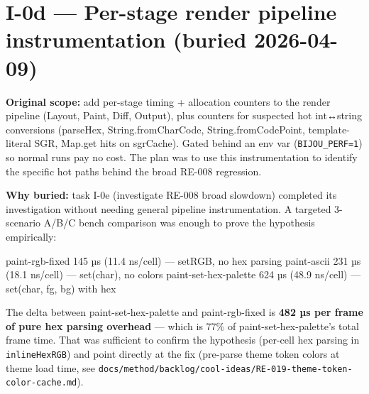 \chapter{I-0d --- Per-stage render pipeline instrumentation (buried 2026-04-09)}\label{record-420}

\smallskip

\textbf{Original scope:} add per-stage timing + allocation counters to the render pipeline (Layout, Paint, Diff, Output), plus counters for suspected hot int↔string conversions (parseHex, String.fromCharCode, String.fromCodePoint, template-literal SGR, Map.get hits on sgrCache). Gated behind an env var (\texttt{B\allowbreak{}I\allowbreak{}J\allowbreak{}O\allowbreak{}U\allowbreak{}\_\allowbreak{}P\allowbreak{}E\allowbreak{}R\allowbreak{}F\allowbreak{}=\allowbreak{}1}) so normal runs pay no cost. The plan was to use this instrumentation to identify the specific hot paths behind the broad RE-008 regression.

\textbf{Why buried:} task I-0e (investigate RE-008 broad slowdown) completed its investigation without needing general pipeline instrumentation. A targeted 3-scenario A/B/C bench comparison was enough to prove the hypothesis empirically:

\begin{CodeBlock}
paint-rgb-fixed   145 µs  (11.4 ns/cell) — setRGB, no hex parsing
paint-ascii       231 µs  (18.1 ns/cell) — set({char}), no colors
paint-set-hex-palette   624 µs  (48.9 ns/cell) — set({char, fg, bg}) with hex
\end{CodeBlock}

The delta between paint-set-hex-palette and paint-rgb-fixed is \textbf{482 µs per frame of pure hex parsing overhead} --- which is 77\% of paint-set-hex-palette's total frame time. That was sufficient to confirm the hypothesis (per-cell hex parsing in \texttt{i\allowbreak{}n\allowbreak{}l\allowbreak{}i\allowbreak{}n\allowbreak{}e\allowbreak{}H\allowbreak{}e\allowbreak{}x\allowbreak{}R\allowbreak{}G\allowbreak{}B}) and point directly at the fix (pre-parse theme token colors at theme load time, see \texttt{d\allowbreak{}o\allowbreak{}c\allowbreak{}s\allowbreak{}/\allowbreak{}m\allowbreak{}e\allowbreak{}t\allowbreak{}h\allowbreak{}o\allowbreak{}d\allowbreak{}/\allowbreak{}b\allowbreak{}a\allowbreak{}c\allowbreak{}k\allowbreak{}l\allowbreak{}o\allowbreak{}g\allowbreak{}/\allowbreak{}c\allowbreak{}o\allowbreak{}o\allowbreak{}l\allowbreak{}-\allowbreak{}i\allowbreak{}d\allowbreak{}e\allowbreak{}a\allowbreak{}s\allowbreak{}/\allowbreak{}R\allowbreak{}E\allowbreak{}-\allowbreak{}0\allowbreak{}1\allowbreak{}9\allowbreak{}-\allowbreak{}t\allowbreak{}h\allowbreak{}e\allowbreak{}m\allowbreak{}e\allowbreak{}-\allowbreak{}t\allowbreak{}o\allowbreak{}k\allowbreak{}e\allowbreak{}n\allowbreak{}-\allowbreak{}c\allowbreak{}o\allowbreak{}l\allowbreak{}o\allowbreak{}r\allowbreak{}-\allowbreak{}c\allowbreak{}a\allowbreak{}c\allowbreak{}h\allowbreak{}e\allowbreak{}.\allowbreak{}m\allowbreak{}d}).

